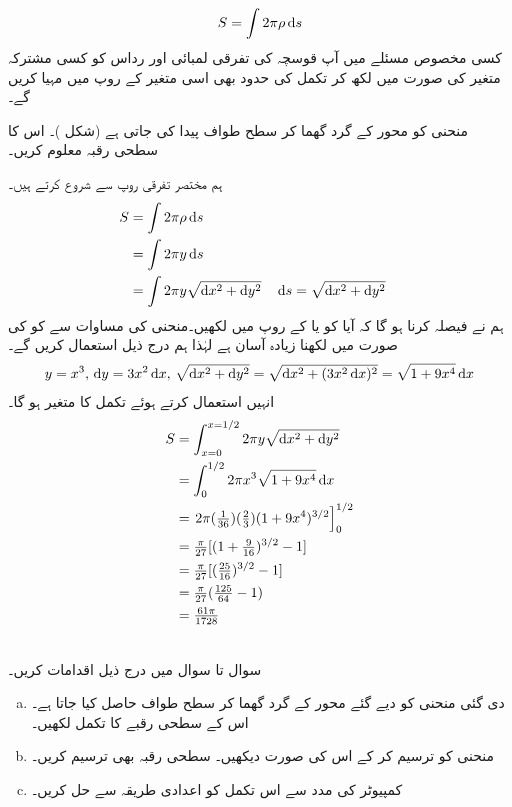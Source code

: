 \\
\begin{align*}
S=\int 2\pi \rho \dif s
\end{align*}
کسی مخصوص مسئلے میں آپ قوسچہ    کی تفرقی لمبائی  اور رداس  کو کسی مشترکہ متغیر کی صورت میں لکھ کر تکمل کی حدود بھی اسی متغیر کے  روپ میں مہیا کریں گے۔ 

منحنی  کو محور  کے گرد گھما کر سطح طواف پیدا کی جاتی ہے (شکل )۔ اس کا سطحی رقبہ معلوم کریں۔

ہم مختصر تفرقی روپ سے شروع کرتے ہیں۔
\begin{align*}
S&=\int 2\pi \rho \dif s\\
&=\int 2\pi y\dif s\\
&=\int 2\pi y\sqrt{\dif x^2+\dif y^2}&&\dif s=\sqrt{\dif x^2+\dif y^2}
\end{align*} 
ہم نے   فیصلہ کرنا ہو گا کہ آیا  کو  یا  کے  روپ میں لکھیں۔منحنی کی مساوات  سے  کو  کی صورت میں لکھنا زیادہ آسان ہے لہٰذا ہم درج ذیل استعمال کریں گے۔
\begin{align*}
y=x^3,\, \dif y=3x^2\dif x,\, \sqrt{\dif x^2+\dif y^2}=\sqrt{\dif x^2+(3x^2\dif x)^2}=\sqrt{1+9x^4}\dif x
\end{align*}
انہیں استعمال کرتے ہوئے تکمل کا متغیر  ہو گا۔
\begin{align*}
S&=\int_{x=0}^{x=1/2}2\pi y\sqrt{\dif x^2+\dif y^2}\\
&=\int_0^{1/2}2\pi x^3\sqrt{1+9x^4}\dif x\\
&=\left.2\pi(\tfrac{1}{36})(\tfrac{2}{3})(1+9x^4)^{3/2}\right]_0^{1/2}\\
&=\tfrac{\pi}{27}[(1+\tfrac{9}{16})^{3/2}-1]\\
&=\tfrac{\pi}{27}[(\tfrac{25}{16})^{3/2}-1]\\
&=\tfrac{\pi}{27}(\tfrac{125}{64}-1)\\
&=\tfrac{61\pi}{1728}
\end{align*}

\\
سوال  تا سوال  میں درج ذیل اقدامات کریں۔
\begin{enumerate}[a.]
\item
دی گئی  منحنی کو دیے گئے محور کے گرد گھما کر سطح طواف حاصل کیا جاتا ہے۔ اس کے سطحی رقبے کا تکمل لکھیں۔
\item
منحنی کو ترسیم کر کے اس کی صورت دیکھیں۔ سطحی رقبہ   بھی ترسیم کریں۔
\item
کمپیوٹر کی مدد سے اس تکمل کو اعدادی طریقہ سے حل کریں۔  
\end{enumerate}

